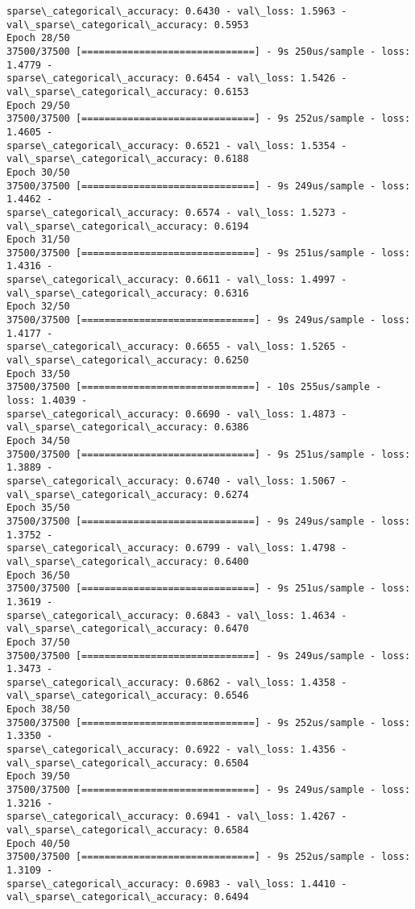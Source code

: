 \documentclass[11pt]{article}
\begin{document}
\begin{Verbatim}[commandchars=\\\{\}]
sparse\_categorical\_accuracy: 0.6430 - val\_loss: 1.5963 -
val\_sparse\_categorical\_accuracy: 0.5953
Epoch 28/50
37500/37500 [==============================] - 9s 250us/sample - loss: 1.4779 -
sparse\_categorical\_accuracy: 0.6454 - val\_loss: 1.5426 -
val\_sparse\_categorical\_accuracy: 0.6153
Epoch 29/50
37500/37500 [==============================] - 9s 252us/sample - loss: 1.4605 -
sparse\_categorical\_accuracy: 0.6521 - val\_loss: 1.5354 -
val\_sparse\_categorical\_accuracy: 0.6188
Epoch 30/50
37500/37500 [==============================] - 9s 249us/sample - loss: 1.4462 -
sparse\_categorical\_accuracy: 0.6574 - val\_loss: 1.5273 -
val\_sparse\_categorical\_accuracy: 0.6194
Epoch 31/50
37500/37500 [==============================] - 9s 251us/sample - loss: 1.4316 -
sparse\_categorical\_accuracy: 0.6611 - val\_loss: 1.4997 -
val\_sparse\_categorical\_accuracy: 0.6316
Epoch 32/50
37500/37500 [==============================] - 9s 249us/sample - loss: 1.4177 -
sparse\_categorical\_accuracy: 0.6655 - val\_loss: 1.5265 -
val\_sparse\_categorical\_accuracy: 0.6250
Epoch 33/50
37500/37500 [==============================] - 10s 255us/sample - loss: 1.4039 -
sparse\_categorical\_accuracy: 0.6690 - val\_loss: 1.4873 -
val\_sparse\_categorical\_accuracy: 0.6386
Epoch 34/50
37500/37500 [==============================] - 9s 251us/sample - loss: 1.3889 -
sparse\_categorical\_accuracy: 0.6740 - val\_loss: 1.5067 -
val\_sparse\_categorical\_accuracy: 0.6274
Epoch 35/50
37500/37500 [==============================] - 9s 249us/sample - loss: 1.3752 -
sparse\_categorical\_accuracy: 0.6799 - val\_loss: 1.4798 -
val\_sparse\_categorical\_accuracy: 0.6400
Epoch 36/50
37500/37500 [==============================] - 9s 251us/sample - loss: 1.3619 -
sparse\_categorical\_accuracy: 0.6843 - val\_loss: 1.4634 -
val\_sparse\_categorical\_accuracy: 0.6470
Epoch 37/50
37500/37500 [==============================] - 9s 249us/sample - loss: 1.3473 -
sparse\_categorical\_accuracy: 0.6862 - val\_loss: 1.4358 -
val\_sparse\_categorical\_accuracy: 0.6546
Epoch 38/50
37500/37500 [==============================] - 9s 252us/sample - loss: 1.3350 -
sparse\_categorical\_accuracy: 0.6922 - val\_loss: 1.4356 -
val\_sparse\_categorical\_accuracy: 0.6504
Epoch 39/50
37500/37500 [==============================] - 9s 249us/sample - loss: 1.3216 -
sparse\_categorical\_accuracy: 0.6941 - val\_loss: 1.4267 -
val\_sparse\_categorical\_accuracy: 0.6584
Epoch 40/50
37500/37500 [==============================] - 9s 252us/sample - loss: 1.3109 -
sparse\_categorical\_accuracy: 0.6983 - val\_loss: 1.4410 -
val\_sparse\_categorical\_accuracy: 0.6494

\end{Verbatim}
\end{document}
